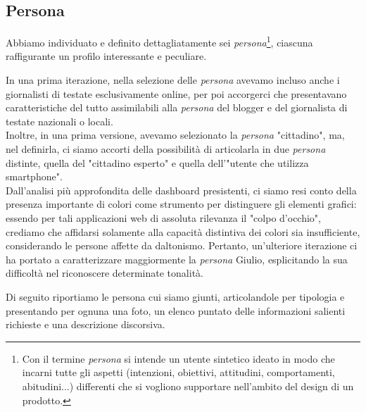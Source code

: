 \subsection{Persona}
Abbiamo individuato e definito dettagliatamente sei \textit{persona}\footnote{Con il termine \textit{persona} si intende un utente sintetico ideato in modo che incarni tutte gli aspetti (intenzioni, obiettivi, attitudini, comportamenti, abitudini...) differenti che si vogliono supportare nell'ambito del design di un prodotto.}, ciascuna raffigurante un profilo interessante e peculiare. 

In una prima iterazione, nella selezione delle \textit{persona} avevamo incluso anche i giornalisti di testate esclusivamente online, per poi accorgerci che presentavano caratteristiche del tutto assimilabili alla \textit{persona} del blogger e del giornalista di testate nazionali o locali. \\ 
Inoltre, in una prima versione, avevamo selezionato la \textit{persona} "cittadino", ma, nel definirla, ci siamo accorti della possibilità di articolarla in due \textit{persona} distinte, quella del "cittadino esperto" e quella dell'"utente che utilizza smartphone".\\
Dall'analisi più approfondita delle dashboard presistenti, ci siamo resi conto della presenza importante di colori come strumento per distinguere gli elementi grafici: essendo per tali applicazioni web di assoluta rilevanza il "colpo d'occhio", crediamo che affidarsi solamente alla capacità distintiva dei colori sia insufficiente, considerando le persone affette da daltonismo. Pertanto, un'ulteriore iterazione ci ha portato a caratterizzare maggiormente la \textit{persona} Giulio, esplicitando la sua difficoltà nel riconoscere determinate tonalità.

Di seguito riportiamo le persona cui siamo giunti, articolandole per tipologia e presentando per ognuna una foto, un elenco puntato delle informazioni salienti richieste e una descrizione discorsiva.

